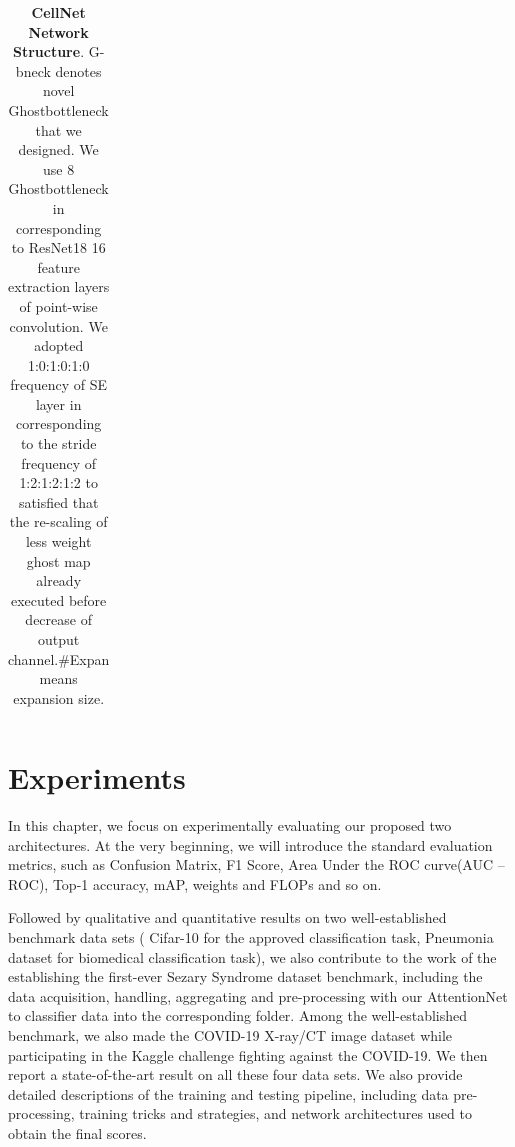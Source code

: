\begin{table}[htbp]
{\begin{tabular}{@{}llllllll@{}}
\end{tabular}}
\caption{\textbf{CellNet Network Structure}. G-bneck denotes novel Ghostbottleneck that we designed. We use 8 Ghostbottleneck in corresponding to ResNet18 \cite{20} 16 feature extraction layers of point-wise convolution. We adopted 1:0:1:0:1:0 frequency of SE layer \cite{24} in corresponding to the stride frequency of 1:2:1:2:1:2 to satisfied that the re-scaling of less weight ghost map already executed before decrease of output channel.\#Expan means expansion size. }
\end{table}
































\chapter{Experiments}
\label{sec:examples}
In this chapter, we focus on experimentally evaluating our proposed two architectures. At the very beginning, we will introduce the standard evaluation metrics, such as Confusion Matrix, F1 Score, Area Under the ROC curve(AUC – ROC), Top-1 accuracy, mAP,  weights and FLOPs and so on. 

Followed by qualitative and quantitative results on two well-established benchmark data sets ( Cifar-10 \cite{21} for the approved classification task, Pneumonia dataset \cite{38} for biomedical classification task), we also contribute to the work of the establishing the first-ever Sezary Syndrome dataset benchmark, including the data acquisition, handling, aggregating and pre-processing with our AttentionNet to classifier data into the corresponding folder. Among the well-established benchmark, we also made the COVID-19 X-ray/CT image dataset while participating in the Kaggle challenge fighting against the COVID-19. We then report a state-of-the-art result on all these four data sets. We also provide detailed descriptions of the training and testing pipeline, including data pre-processing, training tricks and strategies, and network architectures used to obtain the final scores.

